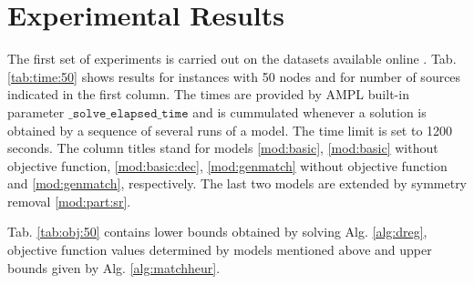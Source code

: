 \section{Experimental Results}

The first set of experiments is carried out on the datasets available online \cite{datasets, steinlib}.
Tab. \ref{tab:time:50} shows results for instances with 50 nodes and for number of sources indicated in the first column. 
The times are provided by AMPL built-in parameter $\texttt{\_solve\_elapsed\_time}$ and is cummulated whenever a solution is obtained by a sequence of several runs of a model.
The time limit is set to 1200 seconds.
The column titles stand for models \eqref{mod:basic}, \eqref{mod:basic} without objective function, \eqref{mod:basic:dec}, \eqref{mod:genmatch} without objective function and \eqref{mod:genmatch}, respectively.
The last two models are extended by symmetry removal \eqref{mod:part:sr}.

Tab. \ref{tab:obj:50} contains lower bounds obtained by solving Alg. \ref{alg:dreg}, objective function values determined by models mentioned above and upper bounds given by Alg. \ref{alg:matchheur}.



